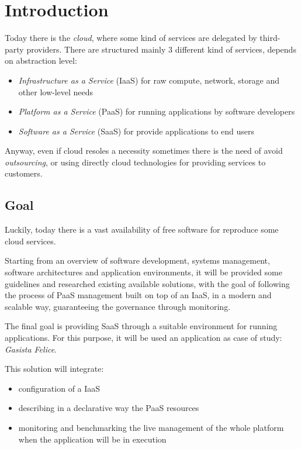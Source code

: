 \chapter{Introduction}\label{introduction}

Today there is the \emph{cloud}, where some kind of services are
delegated by third-party providers. There are structured mainly 3
different kind of services, depends on abstraction level:

\begin{itemize}
\itemsep1pt\parskip0pt
\item
  \emph{Infrastructure as a Service} (IaaS) for raw compute, network,
  storage and other low-level needs
\item
  \emph{Platform as a Service} (PaaS) for running applications by
  software developers
\item
  \emph{Software as a Service} (SaaS) for provide applications to end
  users
\end{itemize}

Anyway, even if cloud resoles a necessity sometimes there is the need of
avoid \emph{outsourcing}, or using directly cloud technologies for
providing services to customers.

\section{Goal}\label{goal}

Luckily, today there is a vast availability of free software for
reproduce some cloud services.

Starting from an overview of software development, systems management,
software architectures and application environments, it will be provided
some guidelines and researched existing available solutions, with the
goal of following the process of PaaS management built on top of an
IaaS, in a modern and scalable way, guaranteeing the governance through
monitoring.

The final goal is providing SaaS through a suitable environment for
running applications. For this purpose, it will be used an application
as case of study: \emph{Gasista Felice}.

This solution will integrate:

\begin{itemize}
\itemsep1pt\parskip0pt
\item
  configuration of a IaaS
\item
  describing in a declarative way the PaaS resources
\item
  monitoring and benchmarking the live management of the whole platform
  when the application will be in execution
\end{itemize}

